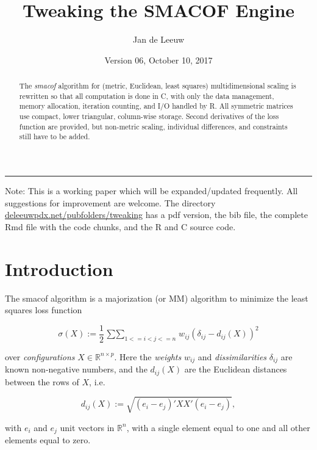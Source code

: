 \documentclass[12pt,]{article}
\title{Tweaking the SMACOF Engine}
\author{Jan de Leeuw}
\date{Version 06, October 10, 2017}
\begin{document}
\maketitle
\begin{abstract}
The \emph{smacof} algorithm for (metric, Euclidean, least squares)
multidimensional scaling is rewritten so that all computation is done in
C, with only the data management, memory allocation, iteration counting,
and I/O handled by R. All symmetric matrices use compact, lower
triangular, column-wise storage. Second derivatives of the loss function
are provided, but non-metric scaling, individual differences, and
constraints still have to be added.
\end{abstract}

{
\setcounter{tocdepth}{3}
\tableofcontents
}
\begin{center}\rule{0.5\linewidth}{\linethickness}\end{center}

Note: This is a working paper which will be expanded/updated frequently.
All suggestions for improvement are welcome. The directory
\href{http://deleeuwpdx.net/pubfolders/tweaking}{deleeuwpdx.net/pubfolders/tweaking}
has a pdf version, the bib file, the complete Rmd file with the code
chunks, and the R and C source code.

\section{Introduction}\label{introduction}

The smacof algorithm is a majorization (or MM) algorithm to minimize the
least squares loss function

\begin{equation}\label{E:loss}
\sigma(X):=\frac12\mathop{\sum\sum}_{1<=i<j<=n}w_{ij}(\delta_{ij}-d_{ij}(X))^2
\end{equation}

over \emph{configurations} \(X\in\mathbb{R}^{n\times p}\). Here the
\emph{weights} \(w_{ij}\) and \emph{dissimilarities} \(\delta_{ij}\) are
known non-negative numbers, and the \(d_{ij}(X)\) are the Euclidean
distances between the rows of \(X\), i.e.

\begin{equation}\label{E:distance}
d_{ij}(X):=\sqrt{(e_i-e_j)'XX'(e_i-e_j)},
\end{equation}

with \(e_i\) and \(e_j\) unit vectors in \(\mathbb{R}^n\), with a single
element equal to one and all other elements equal to zero.
\end{document}
